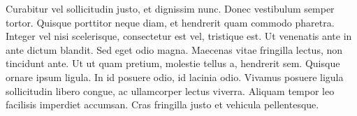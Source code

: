 \documentclass{myCompactDoc}
\begin{document}
Curabitur vel sollicitudin justo, et dignissim nunc. Donec vestibulum semper tortor. Quisque porttitor neque diam, et hendrerit quam commodo pharetra. Integer vel nisi scelerisque, consectetur est vel, tristique est. Ut venenatis ante in ante dictum blandit. Sed eget odio magna. Maecenas vitae fringilla lectus, non tincidunt ante. Ut ut quam pretium, molestie tellus a, hendrerit sem. Quisque ornare ipsum ligula. In id posuere odio, id lacinia odio. Vivamus posuere ligula sollicitudin libero congue, ac ullamcorper lectus viverra. Aliquam tempor leo facilisis imperdiet accumsan. Cras fringilla justo et vehicula pellentesque.

\end{document}
